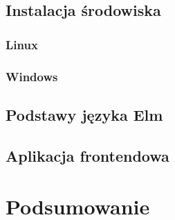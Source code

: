 \documentclass[twoside,a4paper]{book}
\begin{document}
\section{Instalacja środowiska}
\subsection{Linux}
\subsection{Windows}

\section{Podstawy języka Elm}

\section{Aplikacja frontendowa}

\chapter{Podsumowanie}


\backmatter

\listoffigures
\listoftables
\listofalgorithms



\end{document}
